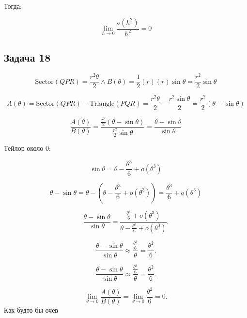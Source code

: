 \documentclass[a4paper,12pt]{article}
\begin{document}
Тогда:

\[
    \lim_{h \to 0} \frac{o(h^2)}{h^2} = 0
\]

\subsection{Задача 18}
\[
    \text{Sector}(QPR) = \frac{r^2 \theta}{2} \land B(\theta) = \frac{1}{2} (r)(r)\sin\theta = \frac{r^2}{2}\sin\theta
\]

\[
    A(\theta) = \text{Sector}(QPR) - \text{Triangle}(PQR) = \frac{r^2 \theta}{2} - \frac{r^2 \sin\theta}{2} = \frac{r^2}{2}(\theta - \sin\theta)
\]

\[
    \frac{A(\theta)}{B(\theta)} = \frac{\frac{r^2}{2}(\theta - \sin\theta)}{\frac{r^2}{2}\sin\theta} = \frac{\theta - \sin\theta}{\sin\theta}
\]

Тейлор около 0:

\[
    \sin\theta = \theta - \frac{\theta^3}{6} + o(\theta^3)
\]


\[
    \theta - \sin\theta = \theta - \left(\theta - \frac{\theta^3}{6} + o(\theta^3)\right) = \frac{\theta^3}{6} + o(\theta^3)
\]

\[
    \frac{\theta - \sin\theta}{\sin\theta} = \frac{\frac{\theta^3}{6} + o(\theta^3)}{\theta - \frac{\theta^3}{6} + o(\theta^3)}.
\]

\[
    \frac{\theta - \sin\theta}{\sin\theta} \approx \frac{\frac{\theta^3}{6}}{\theta} = \frac{\theta^2}{6}.
\]

\[
    \frac{\theta - \sin\theta}{\sin\theta} \approx \frac{\frac{\theta^3}{6}}{\theta} = \frac{\theta^2}{6}.
\]

\[
    \lim_{\theta \to 0} \frac{A(\theta)}{B(\theta)} = \lim_{\theta \to 0} \frac{\theta^2}{6} = 0.
\]
Как будто бы очев
\end{document}
